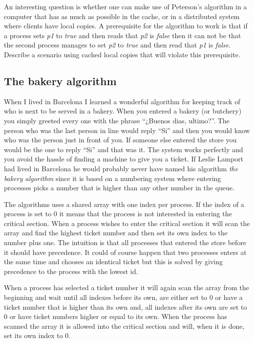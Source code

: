 \documentclass[a4paper,11pt]{article}
\begin{document}
An interesting question is whether one can make use of Peterson's
algorithm in a computer that has as much as possible in the cache, or
in a distributed system where clients have local copies. A
prerequisite for the algorithm to work is that if a process sets {\em
    p1} to {\em true} and then reads that {\em p2} is {\em false} then
it can not be that the second process manages to set {\em p2} to {\em
    true} and then read that {\em p1} is {\em false}. Describe a
scenario using cached local copies that will violate this prerequisite.


\subsection{The bakery algorithm}

When I lived in Barcelona I learned a wonderful algorithm for keeping
track of who is next to be served in a bakery. When you entered a
bakery (or butchery) you simply greeted every one with the phrase
``¿Buenos dias, ultimo?''. The person who was the last person in line
would reply ``Si'' and then you would know who was the person just in
front of you. If someone else entered the store you would be the one
to reply ``Si'' and that was it. The system works perfectly and you
avoid the hassle of finding a machine to give you a ticket. If Leslie
Lamport had lived in Barcelona he would probably never have named his
algorithm {\em the bakery algorithm} since it is based on a numbering
system where entering processes picks a number that is higher than any
other number in the queue.

The algorithms uses a shared array with one index per process. If the
index of a process is set to $0$
it means that the process is not interested in entering the
critical section. When a process wishes to enter the critical section it
will scan the array and find the highest ticket number and then set
its own index to the number plus one. The intuition is that all
processes that entered the store before it should have precedence. It
could of course happen that two processes enters at the same time and
chooses an identical ticket but this is solved by giving precedence to
the process with the lowest id.

When a process has selected a ticket number it will again scan the
array from the beginning and wait until all indexes before its own, are
either set to $0$
or have a ticket number that is higher than its own and, all indexes
after its own are set to $0$
or have ticket numbers higher or equal to its own. When the process
has scanned the array it is allowed into the critical section and will,
when it is done, set its own index to $0$.
\end{document}
